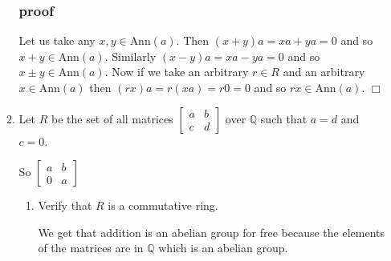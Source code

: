 \documentclass[letterpaper]{article}
\begin{document}
\begin{enumerate}
\begin{enumerate}
  \subsubsection*{proof}
  Let us take any $x,y\in \text{Ann}(a)$. Then $(x+y)a=xa+ya=0$ and so $x+y\in \text{Ann}(a)$. Similarly $(x-y)a=xa-ya=0$ and so $x\pm y\in \text{Ann}(a)$. Now if we take an arbitrary $r\in R$ and an arbitrary $x\in \text{Ann}(a)$ then $(rx)a=r(xa)=r0=0$ and so $rx\in \text{Ann}(a)$.
  $\Box$

  \setcounter{enumii}{16}
  \item
  Let $R$ be the set of all matrices $\left[\begin{array}{cc}a&b\\c&d\end{array}\right]$ over $\mathbb{Q}$ such that $a=d$ and $c=0$.

  So $\left[\begin{array}{cc}a&b\\0&a\end{array}\right]$
    \begin{enumerate}
    \item
    Verify that $R$ is a commutative ring.

    We get that addition is an abelian group for free because the elements of the matrices are in $\mathbb{Q}$ which is an abelian group.


\end{enumerate}
\end{enumerate}
\end{enumerate}
\end{document}
